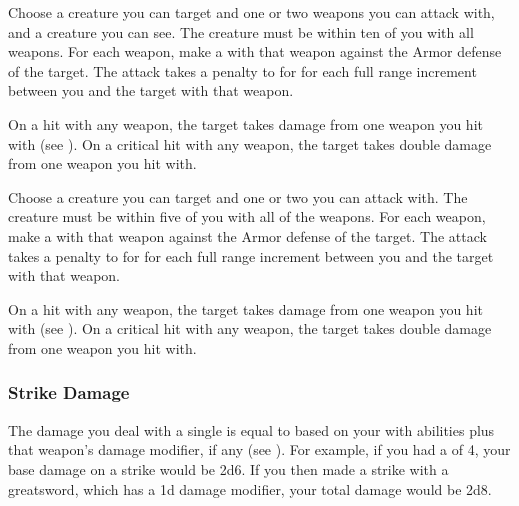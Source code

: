         \begin{freeability}{}
            Choose a creature you can target and one or two  weapons you can attack with, and a creature you can see.
            The creature must be within ten  of you with all weapons.
            For each weapon, make a  with that weapon against the Armor defense of the target.
            The attack takes a  penalty to  for for each full range increment between you and the target with that weapon.

            On a hit with any weapon, the target takes damage from one weapon you hit with (see ).
            On a critical hit with any weapon, the target takes double damage from one weapon you hit with.
        \end{freeability}

        \begin{freeability}{}
            Choose a creature you can target and one or two  you can attack with.
            The creature must be within five  of you with all of the weapons.
            For each weapon, make a  with that weapon against the Armor defense of the target.
            The attack takes a  penalty to  for for each full range increment between you and the target with that weapon.

            On a hit with any weapon, the target takes damage from one weapon you hit with (see ).
            On a critical hit with any weapon, the target takes double damage from one weapon you hit with.
        \end{freeability}

        \subsubsection{Strike Damage}\label{Strike Damage}
            The damage you deal with a single  is equal to  based on your  with  abilities plus that weapon's damage modifier, if any (see ).
            For example, if you had a  of 4, your base damage on a strike would be 2d6.
            If you then made a strike with a greatsword, which has a \plus1d damage modifier, your total damage would be 2d8.

